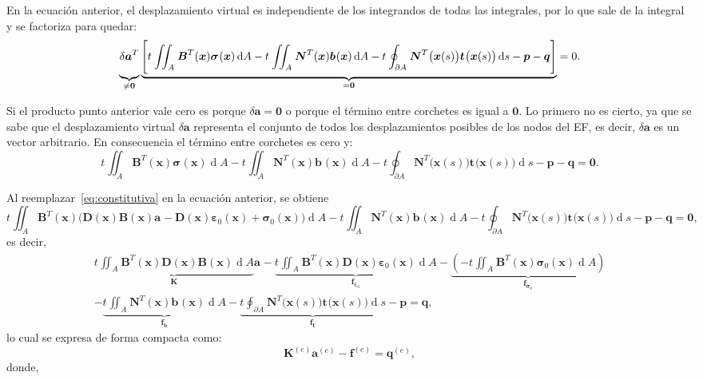 \documentclass[12pt,letterpaper, landscape]{article}
\newcommand{\e}{{}}
\newcommand{\ve}[1]{{\boldsymbol{#1}}}
\newcommand{\ma}[1]{{\boldsymbol{#1}}}
\newcommand{\dd}{\operatorname{d} \!}
\begin{document}
En la ecuación anterior, el desplazamiento virtual es independiente de los integrandos de todas las integrales, por lo que sale de la integral y se factoriza para quedar:
\begin{equation}
\underbrace{\vphantom{\Bigg[}\delta\ve{a}^T}_{\neq\ve{0}} \underbrace{\Bigg[ t^\e \iint_{A^\e} \ma{B}^T(\ve{x}) \ve{\sigma}^\e(\ve{x}) \dd A - t^\e \iint_{A^\e}  \ma{N}^T(\ve{x}) \ve{b}^\e(\ve{x}) \dd A - t^\e \oint_{\partial A^\e} \ma{N}^T\big(\ve{x}(s)\big) \ve{t}^\e\big(\ve{x}(s)\big) \dd s - \ve{p} - \ve{q} \Bigg]}_{=\ve{0}}= 0. \label{eq:PTV3}
\end{equation}

Si el producto punto anterior vale cero es porque $\delta\ve{a} = \ve{0}$ o porque el término entre corchetes es igual a $\ve{0}$. Lo primero no es cierto, ya que se sabe que el desplazamiento virtual $\delta \ve{a}$ representa el conjunto de todos los desplazamientos posibles de los nodos del EF, es decir, $\delta\ve{a}$ es un vector arbitrario. En consecuencia el término entre corchetes es cero y:
\begin{equation}
 t^\e \iint_{A^\e}  \ma{B}^T(\ve{x})  \ve{\sigma}^\e(\ve{x}) \dd A - t^\e \iint_{A^\e}  \ma{N}^T(\ve{x}) \ve{b}^\e(\ve{x}) \dd A -  t^\e \oint_{\partial A^\e} \ma{N}^T\big(\ve{x}(s)\big) \ve{t}^\e\big(\ve{x}(s)\big) \dd s -  \ve{p} - \ve{q} = \ve{0}.
\end{equation}

Al reemplazar~\eqref{eq:constitutiva} en la ecuación anterior, se obtiene
\begin{equation}
t^\e \iint_{A^\e}  \ma{B}^T(\ve{x}) \big(\ma{D}(\ve{x})\ma{B}(\ve{x})\ve{a}^\e - \ma{D}(\ve{x})\ve{\varepsilon}_0(\ve{x}) + \ve{\sigma}_0(\ve{x})\big) \dd A 
- t^\e \iint_{A^\e}  \ma{N}^T(\ve{x}) \ve{b}^\e(\ve{x}) \dd A -  t^\e \oint_{\partial A^\e} \ma{N}^T\big(\ve{x}(s)\big) \ve{t}^\e\big(\ve{x}(s)\big) \dd s -  \ve{p} - \ve{q} = \ve{0},
\end{equation}
es decir,
\begin{multline}
\underbrace{t^\e \iint_{A^\e}  \ma{B}^T(\ve{x})\ma{D}(\ve{x})\ma{B}(\ve{x}) \dd A}_{\ma{K}} \ve{a}^\e
% 
- \underbrace{t^\e \iint_{A^\e}  \ma{B}^T(\ve{x})\ma{D}(\ve{x})\ve{\varepsilon}_0(\ve{x}) \dd A}_{\ve{f}_{\ve{\varepsilon}_0}} 
%
- \underbrace{\left(-t^\e \iint_{A^\e}  \ma{B}^T(\ve{x})\ve{\sigma}_0(\ve{x}) \dd A \right)}_{\ve{f}_{\ve{\sigma}_0}} \\
%
- \underbrace{t^\e \iint_{A^\e}  \ma{N}^T(\ve{x}) \ve{b}^\e(\ve{x}) \dd A}_{\ve{f}_\ve{b}}
%
- \underbrace{t^\e \oint_{\partial A^\e} \ma{N}^T\big(\ve{x}(s)\big) \ve{t}^\e\big(\ve{x}(s)\big) \dd s}_{\ve{f}_\ve{t}} 
%
- \ve{p} = \ve{q},
\end{multline}
lo cual se expresa de forma compacta como:
\begin{equation}
\ma{K}^{(e)} \ve{a}^{(e)} - \ma{f}^{(e)} = \ma{q}^{(e)},
\end{equation}
donde,
\end{document}
